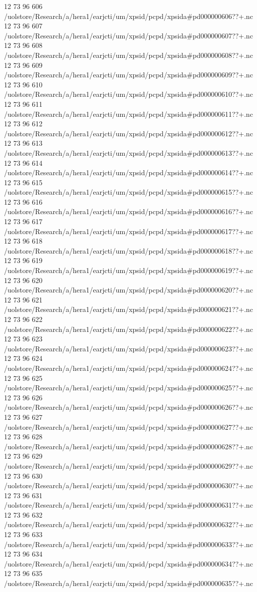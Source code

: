 12 73 96
606
/uolstore/Research/a/hera1/earjcti/um/xpsid/pcpd/xpsida#pd000000606??+.nc
12 73 96
607
/uolstore/Research/a/hera1/earjcti/um/xpsid/pcpd/xpsida#pd000000607??+.nc
12 73 96
608
/uolstore/Research/a/hera1/earjcti/um/xpsid/pcpd/xpsida#pd000000608??+.nc
12 73 96
609
/uolstore/Research/a/hera1/earjcti/um/xpsid/pcpd/xpsida#pd000000609??+.nc
12 73 96
610
/uolstore/Research/a/hera1/earjcti/um/xpsid/pcpd/xpsida#pd000000610??+.nc
12 73 96
611
/uolstore/Research/a/hera1/earjcti/um/xpsid/pcpd/xpsida#pd000000611??+.nc
12 73 96
612
/uolstore/Research/a/hera1/earjcti/um/xpsid/pcpd/xpsida#pd000000612??+.nc
12 73 96
613
/uolstore/Research/a/hera1/earjcti/um/xpsid/pcpd/xpsida#pd000000613??+.nc
12 73 96
614
/uolstore/Research/a/hera1/earjcti/um/xpsid/pcpd/xpsida#pd000000614??+.nc
12 73 96
615
/uolstore/Research/a/hera1/earjcti/um/xpsid/pcpd/xpsida#pd000000615??+.nc
12 73 96
616
/uolstore/Research/a/hera1/earjcti/um/xpsid/pcpd/xpsida#pd000000616??+.nc
12 73 96
617
/uolstore/Research/a/hera1/earjcti/um/xpsid/pcpd/xpsida#pd000000617??+.nc
12 73 96
618
/uolstore/Research/a/hera1/earjcti/um/xpsid/pcpd/xpsida#pd000000618??+.nc
12 73 96
619
/uolstore/Research/a/hera1/earjcti/um/xpsid/pcpd/xpsida#pd000000619??+.nc
12 73 96
620
/uolstore/Research/a/hera1/earjcti/um/xpsid/pcpd/xpsida#pd000000620??+.nc
12 73 96
621
/uolstore/Research/a/hera1/earjcti/um/xpsid/pcpd/xpsida#pd000000621??+.nc
12 73 96
622
/uolstore/Research/a/hera1/earjcti/um/xpsid/pcpd/xpsida#pd000000622??+.nc
12 73 96
623
/uolstore/Research/a/hera1/earjcti/um/xpsid/pcpd/xpsida#pd000000623??+.nc
12 73 96
624
/uolstore/Research/a/hera1/earjcti/um/xpsid/pcpd/xpsida#pd000000624??+.nc
12 73 96
625
/uolstore/Research/a/hera1/earjcti/um/xpsid/pcpd/xpsida#pd000000625??+.nc
12 73 96
626
/uolstore/Research/a/hera1/earjcti/um/xpsid/pcpd/xpsida#pd000000626??+.nc
12 73 96
627
/uolstore/Research/a/hera1/earjcti/um/xpsid/pcpd/xpsida#pd000000627??+.nc
12 73 96
628
/uolstore/Research/a/hera1/earjcti/um/xpsid/pcpd/xpsida#pd000000628??+.nc
12 73 96
629
/uolstore/Research/a/hera1/earjcti/um/xpsid/pcpd/xpsida#pd000000629??+.nc
12 73 96
630
/uolstore/Research/a/hera1/earjcti/um/xpsid/pcpd/xpsida#pd000000630??+.nc
12 73 96
631
/uolstore/Research/a/hera1/earjcti/um/xpsid/pcpd/xpsida#pd000000631??+.nc
12 73 96
632
/uolstore/Research/a/hera1/earjcti/um/xpsid/pcpd/xpsida#pd000000632??+.nc
12 73 96
633
/uolstore/Research/a/hera1/earjcti/um/xpsid/pcpd/xpsida#pd000000633??+.nc
12 73 96
634
/uolstore/Research/a/hera1/earjcti/um/xpsid/pcpd/xpsida#pd000000634??+.nc
12 73 96
635
/uolstore/Research/a/hera1/earjcti/um/xpsid/pcpd/xpsida#pd000000635??+.nc
